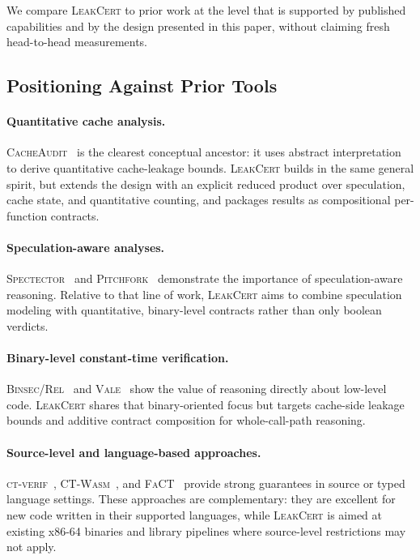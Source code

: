 \documentclass{article}
\theoremstyle{definition}
\theoremstyle{remark}
\newcommand{\CacheAudit}{\textsc{CacheAudit}}
\newcommand{\Spectector}{\textsc{Spectector}}
\newcommand{\BinsecRel}{\textsc{Binsec/Rel}}
\newcommand{\ctverif}{\textsc{ct-verif}}
\newcommand{\Pitchfork}{\textsc{Pitchfork}}
\newcommand{\CTWasm}{\textsc{CT-Wasm}}
\newcommand{\Vale}{\textsc{Vale}}
\newcommand{\FaCT}{\textsc{FaCT}}
\begin{document}
We compare \textsc{LeakCert} to prior work at the level that is supported by
published capabilities and by the design presented in this paper, without
claiming fresh head-to-head measurements.

\subsection{Positioning Against Prior Tools}

\paragraph{Quantitative cache analysis.}
\CacheAudit{}~\cite{doychev2015cacheaudit} is the clearest conceptual ancestor:
it uses abstract interpretation to derive quantitative cache-leakage bounds.
\textsc{LeakCert} builds in the same general spirit, but extends the design with
an explicit reduced product over speculation, cache state, and quantitative
counting, and packages results as compositional per-function contracts.

\paragraph{Speculation-aware analyses.}
\Spectector{}~\cite{guarnieri2020spectector} and
\Pitchfork{}~\cite{cauligi2020constant} demonstrate the importance of
speculation-aware reasoning. Relative to that line of work, \textsc{LeakCert}
aims to combine speculation modeling with quantitative, binary-level contracts
rather than only boolean verdicts.

\paragraph{Binary-level constant-time verification.}
\BinsecRel{}~\cite{daniel2020binsecrel} and \Vale{}~\cite{bond2017vale} show
the value of reasoning directly about low-level code. \textsc{LeakCert} shares
that binary-oriented focus but targets cache-side leakage bounds and additive
contract composition for whole-call-path reasoning.

\paragraph{Source-level and language-based approaches.}
\ctverif{}~\cite{almeida2016verifying}, \CTWasm{}~\cite{watt2019ct}, and
\FaCT{}~\cite{cauligi2019fact} provide strong guarantees in source or typed
language settings. These approaches are complementary: they are excellent for
new code written in their supported languages, while \textsc{LeakCert} is aimed
at existing x86-64 binaries and library pipelines where source-level
restrictions may not apply.
\end{document}
